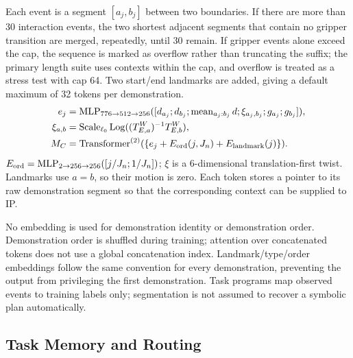 \documentclass[
  10pt,
]{article}
\begin{document}
Each event is a segment \([a_j,b_j]\) between two boundaries. If there are more than 30 interaction events, the two shortest adjacent segments that contain no gripper transition are merged, repeatedly, until 30 remain. If gripper events alone exceed the cap, the sequence is marked as overflow rather than truncating the suffix; the primary length suite uses contexts within the cap, and overflow is treated as a stress test with cap 64. Two start/end landmarks are added, giving a default maximum of 32 tokens per demonstration.
\begin{equation}\label{eq:eventtoken}
\begin{aligned}
e_j&=\operatorname{MLP}_{776\to512\to256}([d_{a_j};d_{b_j};\operatorname{mean}_{a_j:b_j}d;\xi_{a_j,b_j};g_{a_j};g_{b_j}]),\\
\xi_{a,b}&=\operatorname{Scale}_{\ell_0}\operatorname{Log}((T^W_{E,a})^{-1}T^W_{E,b}),\\
M_C&=\operatorname{Transformer}^{(2)}(\{e_j+E_{\rm ord}(j,J_n)+E_{\rm landmark}(j)\}).
\end{aligned}
\end{equation}
\(E_{\rm ord}=\operatorname{MLP}_{2\to256\to256}([j/J_n;1/J_n])\); \(\xi\) is a 6-dimensional translation-first twist. Landmarks use \(a=b\), so their motion is zero. Each token stores a pointer to its raw demonstration segment so that the corresponding context can be supplied to IP.

No embedding is used for demonstration identity or demonstration order. Demonstration order is shuffled during training; attention over concatenated tokens does not use a global concatenation index. Landmark/type/order embeddings follow the same convention for every demonstration, preventing the output from privileging the first demonstration. Task programs map observed events to training labels only; segmentation is not assumed to recover a symbolic plan automatically.

\hypertarget{task-memory-vuxe0-routing}{%
\subsection{Task Memory and Routing}\label{task-memory-vuxe0-routing}}
\end{document}
